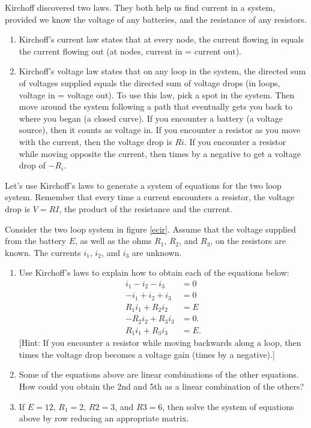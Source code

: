 Kirchoff discovered two laws. They both help us find current in a system, provided we know the voltage of any batteries, and the resistance of any resistors. 
\begin{enumerate}
	\item Kirchoff's current law states that at every node, the current flowing in equals the current flowing out (at nodes, current in = current out). 
	\item Kirchoff's voltage law states that on any loop in the system, the directed sum of voltages supplied equals the directed sum of voltage drops (in loops, voltage in = voltage out). To use this law, pick a spot in the system.  Then move around the system following a path that eventually gets you back to where you began (a closed curve). If you encounter a battery (a voltage source), then it counts as voltage in.  If you encounter a resistor as you move with the current, then the voltage drop is $Ri$.  If you encounter a resistor while moving opposite the current, then times by a negative to get a voltage drop of $-R_i$.
\end{enumerate}

Let's use Kirchoff's laws to generate a system of equations for the two loop system. Remember that every time a current encounters a resistor, the voltage drop is $V=RI$, the product of the resistance and the current. 
\begin{problem} \label{kirchoff 2 loop general}
Consider the two loop system in figure \ref{ecir}. Assume that the voltage supplied from the battery $E$, as well as the ohms $R_1$, $R_2$, and $R_3$, on the resistors are known. The currents $i_1$, $i_2$, and $i_3$ are unknown.
\begin{enumerate}
 \item Use Kirchoff's laws to explain how to obtain each of the equations below:
$$
\begin{array}{rl}
i_1-i_2-i_3&=0\\
-i_1+i_2+i_3&=0\\
R_1i_1+R_2i_2&=E\\
-R_2 i_2 +R_3i_3&=0.\\
R_1i_1 + R_3i_3&=E.
\end{array}
$$
[Hint: If you encounter a resistor while moving backwards along a loop, then times the voltage drop becomes a voltage gain (times by a negative).]
 \item Some of the equations above are linear combinations of the other equations.  How could you obtain the 2nd and 5th as a linear combination of the others?
 \item If $E = 12$, $R_1 = 2$, $R2 = 3$, and  $R3 = 6$, then solve the system of equations above by row reducing an appropriate matrix.    
\end{enumerate}
\end{problem}

